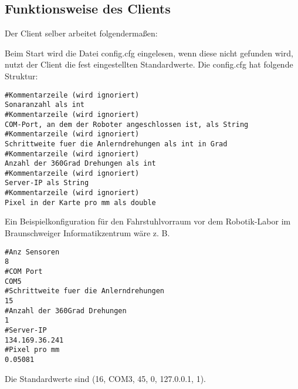 \subsection{Funktionsweise des Clients}
\label{sec:funktionsweise}


Der Client selber arbeitet folgendermaßen:

Beim Start wird die Datei config.cfg eingelesen, wenn diese nicht gefunden
wird, nutzt der Client die fest eingestellten Standardwerte. Die config.cfg
hat folgende Struktur:

\begin{lstlisting}
#Kommentarzeile (wird ignoriert)
Sonaranzahl als int
#Kommentarzeile (wird ignoriert)
COM-Port, an dem der Roboter angeschlossen ist, als String
#Kommentarzeile (wird ignoriert)
Schrittweite fuer die Anlerndrehungen als int in Grad
#Kommentarzeile (wird ignoriert)
Anzahl der 360Grad Drehungen als int
#Kommentarzeile (wird ignoriert)
Server-IP als String
#Kommentarzeile (wird ignoriert)
Pixel in der Karte pro mm als double
\end{lstlisting}

Ein Beispielkonfiguration für den Fahrstuhlvorraum vor dem
Robotik-Labor im Braunschweiger Informatikzentrum wäre z. B.
\begin{lstlisting}
#Anz Sensoren
8
#COM Port
COM5
#Schrittweite fuer die Anlerndrehungen
15
#Anzahl der 360Grad Drehungen
1
#Server-IP
134.169.36.241
#Pixel pro mm
0.05081
\end{lstlisting}
Die Standardwerte sind (16, COM3, 45, 0, 127.0.0.1, 1).

